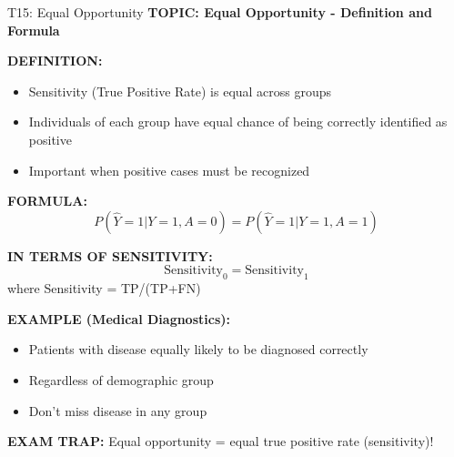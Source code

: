 \documentclass[8pt]{beamer}
\begin{document}
	\begin{frame}{T15: Equal Opportunity}
		\fontsize{6.5}{7.5}\selectfont
		\textbf{TOPIC: Equal Opportunity - Definition and Formula}
		
		\vspace{0.1cm}
		\textbf{DEFINITION:}
		\begin{itemize}
			\item Sensitivity (True Positive Rate) is equal across groups
			\item Individuals of each group have equal chance of being correctly identified as positive
			\item Important when positive cases must be recognized
		\end{itemize}
		
		\vspace{0.1cm}
		\textbf{FORMULA:}
		\[
		P(\hat{Y}=1|Y=1,A=0) = P(\hat{Y}=1|Y=1,A=1)
		\]
		
		\vspace{0.1cm}
		\textbf{IN TERMS OF SENSITIVITY:}
		\[
		\text{Sensitivity}_0 = \text{Sensitivity}_1
		\]
		where Sensitivity = TP/(TP+FN)
		
		\vspace{0.1cm}
		\textbf{EXAMPLE (Medical Diagnostics):}
		\begin{itemize}
			\item Patients with disease equally likely to be diagnosed correctly
			\item Regardless of demographic group
			\item Don't miss disease in any group
		\end{itemize}
		
		\textcolor{myred}{\textbf{EXAM TRAP:}} Equal opportunity = \textcolor{myblue}{equal true positive rate (sensitivity)}!
	\end{frame}
	
\end{document}
